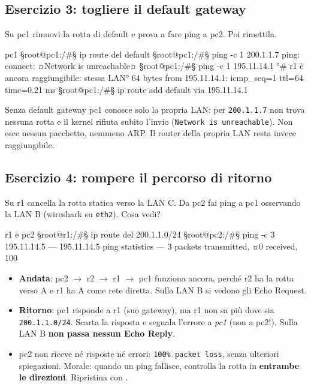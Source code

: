 \subsection{Esercizio 3: togliere il default gateway}
\begin{esempio}[Consegna]
Su pc1 rimuovi la rotta di default e prova a fare ping a pc2. Poi rimettila.
\end{esempio}
\begin{terminale}{pc1}
§root@pc1:/#§ ip route del default
§root@pc1:/#§ ping -c 1 200.1.1.7
ping: connect: ¤Network is unreachable¤
§root@pc1:/#§ ping -c 1 195.11.14.1       °# r1 è ancora raggiungibile: stessa LAN°
64 bytes from 195.11.14.1: icmp_seq=1 ttl=64 time=0.21 ms
§root@pc1:/#§ ip route add default via 195.11.14.1
\end{terminale}
\begin{tecnica}[Soluzione]
Senza default gateway pc1 conosce solo la propria LAN: per \texttt{200.1.1.7} non trova nessuna rotta e il kernel rifiuta subito l'invio (\texttt{Network is unreachable}). Non esce nessun pacchetto, nemmeno ARP. Il router della propria LAN resta invece raggiungibile.
\end{tecnica}

\subsection{Esercizio 4: rompere il percorso di ritorno}
\begin{esempio}[Consegna]
Su r1 cancella la rotta statica verso la LAN C. Da pc2 fai ping a pc1 osservando la LAN B (wireshark su \texttt{eth2}). Cosa vedi?
\end{esempio}
\begin{terminale}{r1 e pc2}
§root@r1:/#§ ip route del 200.1.1.0/24
§root@pc2:/#§ ping -c 3 195.11.14.5
--- 195.11.14.5 ping statistics ---
3 packets transmitted, ¤0 received, 100%
\end{terminale}
\begin{tecnica}[Soluzione]
\begin{itemize}
  \item \textbf{Andata}: pc2 $\to$ r2 $\to$ r1 $\to$ pc1 funziona ancora, perché r2 ha la rotta verso A e r1 ha A come rete diretta. Sulla LAN B si vedono gli Echo Request.
  \item \textbf{Ritorno}: pc1 risponde a r1 (suo gateway), ma r1 non sa più dove sia \texttt{200.1.1.0/24}. Scarta la risposta e segnala l'errore a \emph{pc1} (non a pc2!). Sulla LAN B \textbf{non passa nessun Echo Reply}.
  \item pc2 non riceve né risposte né errori: \texttt{100\% packet loss}, senza ulteriori spiegazioni. Morale: quando un ping fallisce, controlla la rotta in \textbf{entrambe le direzioni}. Ripristina con .
\end{itemize}
\end{tecnica}

